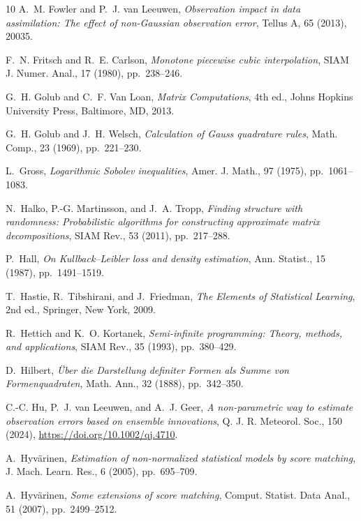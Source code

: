 \begin{thebibliography}{10}
{\sc A.~M. Fowler and P.~J. van Leeuwen}, {\em Observation impact in data assimilation: The effect of non-Gaussian observation error}, Tellus A, 65 (2013), 20035.

{\sc F.~N. Fritsch and R.~E. Carlson}, {\em Monotone piecewise cubic interpolation}, SIAM J. Numer. Anal., 17 (1980), pp.~238--246.

{\sc G.~H. Golub and C.~F. Van Loan}, {\em Matrix Computations}, 4th ed., Johns Hopkins University Press, Baltimore, MD, 2013.

{\sc G.~H. Golub and J.~H. Welsch}, {\em Calculation of {G}auss quadrature rules}, Math. Comp., 23 (1969), pp.~221--230.

{\sc L.~Gross}, {\em Logarithmic {S}obolev inequalities}, Amer. J. Math., 97 (1975), pp.~1061--1083.

{\sc N.~Halko, P.-G. Martinsson, and J.~A. Tropp}, {\em Finding structure with randomness: Probabilistic algorithms for constructing approximate matrix decompositions}, SIAM Rev., 53 (2011), pp.~217--288.

{\sc P.~Hall}, {\em On {K}ullback--{L}eibler loss and density estimation}, Ann. Statist., 15 (1987), pp.~1491--1519.

{\sc T.~Hastie, R.~Tibshirani, and J.~Friedman}, {\em The Elements of Statistical Learning}, 2nd ed., Springer, New York, 2009.

{\sc R.~Hettich and K.~O. Kortanek}, {\em Semi-infinite programming: Theory, methods, and applications}, SIAM Rev., 35 (1993), pp.~380--429.

{\sc D.~Hilbert}, {\em \"{U}ber die {D}arstellung definiter {F}ormen als {S}umme von {F}ormenquadraten}, Math. Ann., 32 (1888), pp.~342--350.

{\sc C.-C. Hu, P.~J. van Leeuwen, and A.~J. Geer}, {\em A non-parametric way to estimate observation errors based on ensemble innovations}, Q. J. R. Meteorol. Soc., 150 (2024), \url{https://doi.org/10.1002/qj.4710}.

{\sc A.~Hyv\"arinen}, {\em Estimation of non-normalized statistical models by score matching}, J. Mach. Learn. Res., 6 (2005), pp.~695--709.

{\sc A.~Hyv\"arinen}, {\em Some extensions of score matching}, Comput. Statist. Data Anal., 51 (2007), pp.~2499--2512.


\end{thebibliography}
